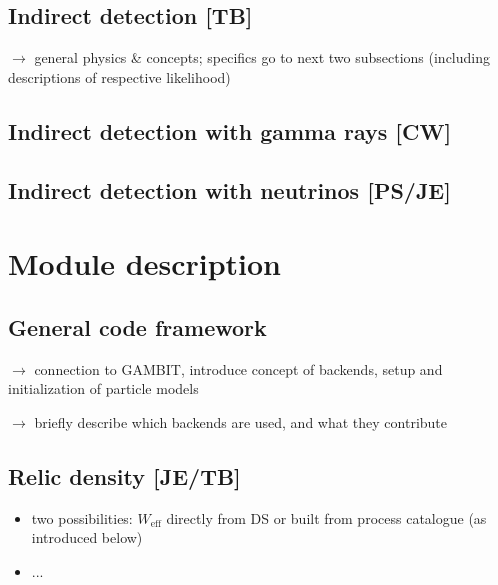 \subsection{Indirect detection {\bf [TB]}}
\label{phys_id}

$\to$ general physics \& concepts; specifics go to next two subsections 
(including descriptions of respective likelihood)

\subsection{Indirect detection with gamma rays {\bf [CW]}}
\label{phys_ga}

\subsection{Indirect detection with neutrinos {\bf [PS/JE]}}
\label{phys_nu}




\section{Module description}
\label{code}


\subsection{General code framework}
\label{code_gen}

$\to$ connection to GAMBIT, introduce concept of backends, setup and initialization of particle models

\noindent
$\to$ briefly describe which backends are used, and what they contribute 


\subsection{Relic density {\bf [JE/TB]}}
\label{code_rd}
\begin{itemize}
\item two possibilities: $W_\mathrm{eff}$ directly from DS or built from process catalogue (as introduced below)
\item...
\end{itemize}

